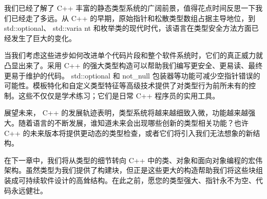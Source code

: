 我们已经了解了 C++ 丰富的静态类型系统的广阔前景，值得花点时间反思一下我们已经走了多远。从 C++ 的早期，原始指针和松散类型数组占据主导地位，到 std::optional、 std::varia nt 和枚举类的现代时代，该语言在类型安全方法方面已经发生了巨大的变化。

当我们考虑这些进步如何改进单个代码片段和整个软件系统时，它们的真正威力就凸显出来了。采用 C++ 的强大类型构造可以帮助我们编写更安全、更易读、最终更易于维护的代码。 std::optional 和 not\_null 包装器等功能可减少空指针错误的可能性。模板特化和自定义类型特征等高级技术提供了对类型行为前所未有的控制。这些不仅仅是学术练习；它们是日常 C++ 程序员的实用工具。

展望未来， C++ 的发展轨迹表明，类型系统将越来越细致入微，功能越来越强大。随着语言的不断发展，谁知道未来会出现哪些创新的类型相关功能？也许 C++ 的未来版本将提供更动态的类型检查，或者它们将引入我们无法想象的新结构。

在下一章中，我们将从类型的细节转向 C++ 中的类、对象和面向对象编程的宏伟架构。虽然类型为我们提供了构建块，但正是这些更大的构造帮助我们将这些块组装成可持续软件设计的高耸结构。在此之前，愿您的类型强大、指针永不为空、代码永远健壮。